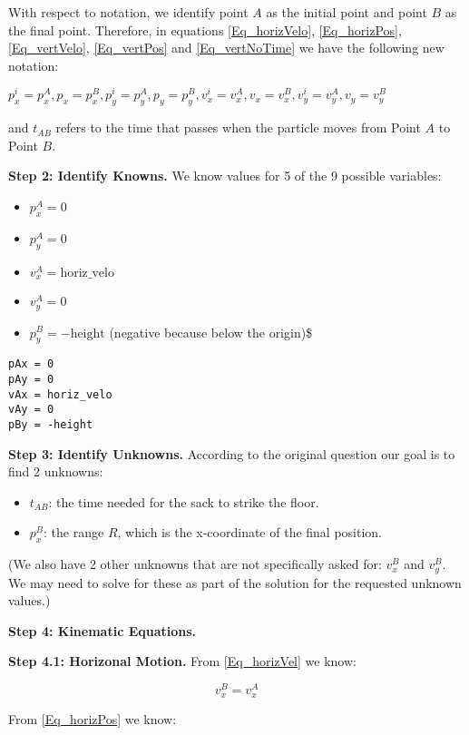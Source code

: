 \documentclass[11pt]{article}
\begin{document}
With respect to notation, we identify point \(A\) as the initial point
and point \(B\) as the final point.  Therefore, in equations
\ref{Eq_horizVelo},
\ref{Eq_horizPos},
\ref{Eq_vertVelo}, \ref{Eq_vertPos}
and \ref{Eq_vertNoTime} we have the following new
notation:

\(p^i_x = p^A_x, p_x = p^B_x, p^i_y = p^A_y, p_y = p^B_y, v^i_x = v^A_x, v_x = v^B_x, v^i_y = v^A_y, v_y = v^B_y\)

and \(t_{AB}\) refers to the time that passes when the particle moves from Point \(A\) to Point \(B\).

\textbf{Step 2: Identify Knowns.} We know values for 5 of the 9 possible
variables:

\begin{itemize}
\item \(p_x^A = 0\)
\item \(p_y^A = 0\)
\item \(v_x^A = \text{horiz_velo}\)
\item \(v_y^A = 0\)
\item \(p_y^B = -\text{height}\) (negative because below the origin)\$
\end{itemize}

\begin{verbatim}
pAx = 0
pAy = 0
vAx = horiz_velo
vAy = 0
pBy = -height
\end{verbatim}

\textbf{Step 3: Identify Unknowns.} According to the original question our goal is to find 2 unknowns:

\begin{itemize}
\item \(t_{AB}\): the time needed for the sack to strike the floor.
\item \(p_x^B\): the range \(R\), which is the x-coordinate of the final position.
\end{itemize}

(We also have 2 other unknowns that are not specifically asked for:
\(v_x^B\) and \(v_y^B\).  We may need to solve for these as part of the
solution for the requested unknown values.)

\textbf{Step 4: Kinematic Equations.}

\textbf{Step 4.1: Horizonal Motion.} From \ref{Eq_horizVel} we know:

\begin{equation}
\label{Eq_1}
v_x^B = v_x^A
\end{equation}

From \ref{Eq_horizPos} we know:
\end{document}
